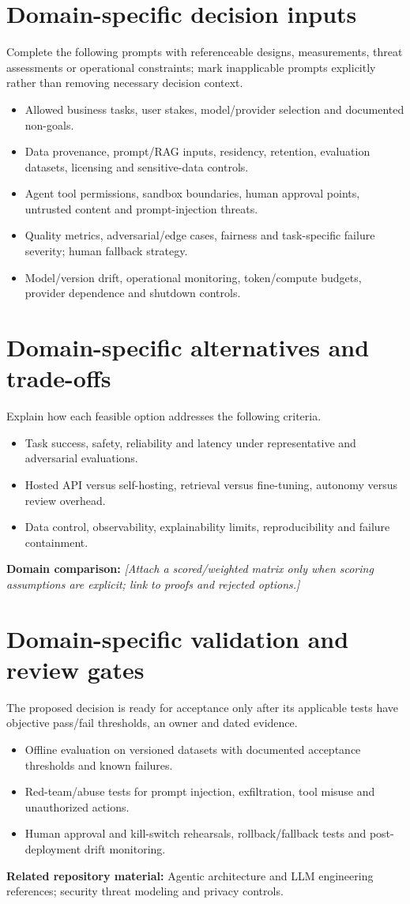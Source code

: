 \documentclass[11pt,letterpaper]{article}
\begin{document}
\section{Domain-specific decision inputs}
Complete the following prompts with referenceable designs, measurements,
threat assessments or operational constraints; mark inapplicable prompts
explicitly rather than removing necessary decision context.
\begin{itemize}
\item Allowed business tasks, user stakes, model/provider selection and documented non-goals.
\item Data provenance, prompt/RAG inputs, residency, retention, evaluation datasets, licensing and sensitive-data controls.
\item Agent tool permissions, sandbox boundaries, human approval points, untrusted content and prompt-injection threats.
\item Quality metrics, adversarial/edge cases, fairness and task-specific failure severity; human fallback strategy.
\item Model/version drift, operational monitoring, token/compute budgets, provider dependence and shutdown controls.
\end{itemize}
\section{Domain-specific alternatives and trade-offs}
Explain how each feasible option addresses the following criteria.
\begin{itemize}
\item Task success, safety, reliability and latency under representative and adversarial evaluations.
\item Hosted API versus self-hosting, retrieval versus fine-tuning, autonomy versus review overhead.
\item Data control, observability, explainability limits, reproducibility and failure containment.
\end{itemize}
\noindent\textbf{Domain comparison:} \emph{[Attach a scored/weighted matrix only
when scoring assumptions are explicit; link to proofs and rejected options.]}
\section{Domain-specific validation and review gates}
The proposed decision is ready for acceptance only after its applicable
tests have objective pass/fail thresholds, an owner and dated evidence.
\begin{itemize}
\item Offline evaluation on versioned datasets with documented acceptance thresholds and known failures.
\item Red-team/abuse tests for prompt injection, exfiltration, tool misuse and unauthorized actions.
\item Human approval and kill-switch rehearsals, rollback/fallback tests and post-deployment drift monitoring.
\end{itemize}
\noindent\textbf{Related repository material:} Agentic architecture and LLM engineering references; security threat modeling and privacy controls.
\end{document}
